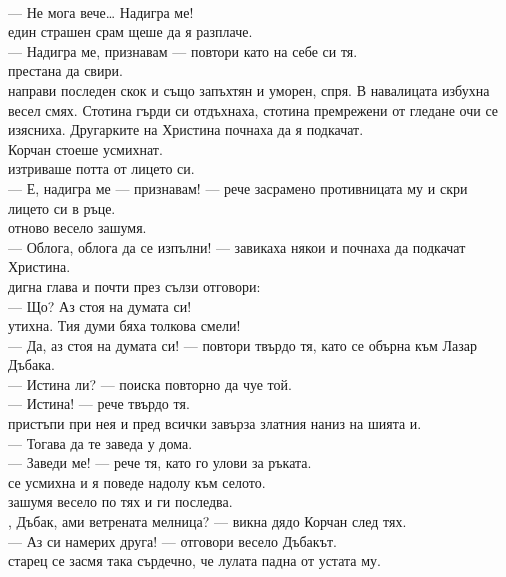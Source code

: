 \documentclass[12pt,a4paper]{article}
\begin{document}
\\
— Не мога вече… Надигра ме!
\\
 един страшен срам щеше да я разплаче.
\\
— Надигра ме, признавам — повтори като на себе си тя.
\\
 престана да свири.
\\
 направи последен скок и също запъхтян и уморен, спря. В навалицата избухна весел смях. Стотина гърди си отдъхнаха, стотина премрежени от гледане очи се изясниха. Другарките на Христина почнаха да я подкачат.
\\
 Корчан стоеше усмихнат.
\\
 изтриваше потта от лицето си.
\\
— Е, надигра ме — признавам! — рече засрамено противницата му и скри лицето си в ръце.
\\
 отново весело зашумя.
\\
— Облога, облога да се изпълни! — завикаха някои и почнаха да подкачат Христина.
\\
 дигна глава и почти през сълзи отговори:
\\
— Що? Аз стоя на думата си!
\\
 утихна. Тия думи бяха толкова смели!
\\
— Да, аз стоя на думата си! — повтори твърдо тя, като се обърна към Лазар Дъбака.
\\
— Истина ли? — поиска повторно да чуе той.
\\
— Истина! — рече твърдо тя.
\\
 пристъпи при нея и пред всички завърза златния наниз на шията и.
\\
— Тогава да те заведа у дома.
\\
— Заведи ме! — рече тя, като го улови за ръката.
\\
 се усмихна и я поведе надолу към селото.
\\
 зашумя весело по тях и ги последва.
\\
, Дъбак, ами ветрената мелница? — викна дядо Корчан след тях.
\\
— Аз си намерих друга! — отговори весело Дъбакът.
\\
 старец се засмя така сърдечно, че лулата падна от устата му.
\end{document}
